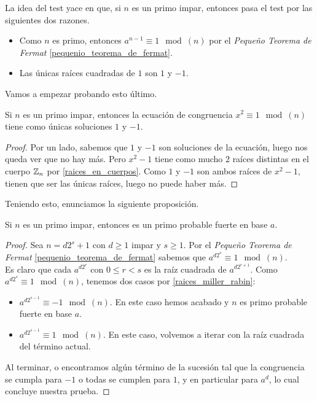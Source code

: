La idea del test yace en que, si $n$ es un primo impar, entonces pasa el test por las siguientes dos razones.

\begin{itemize}
	\item Como $n$ es primo, entonces $a^{n-1} \equiv 1 \mod(n)$ por el \textit{Pequeño Teorema de Fermat} \ref{pequenio_teorema_de_fermat}.
	
	\item Las únicas raíces cuadradas de $1$ son $1$ y $-1$.
\end{itemize}

Vamos a empezar probando esto último.

\begin{proposicion}\label{raices_miller_rabin}
	Si $n$ es un primo impar, entonces la ecuación de congruencia $x^2 \equiv 1 \mod(n)$ tiene como únicas soluciones $1$ y $-1$.
\end{proposicion}

\begin{proof}
	Por un lado, sabemos que $1$ y $-1$ son soluciones de la ecuación, luego nos queda ver que no hay más. Pero $x^2 - 1$ tiene como mucho $2$ raíces distintas en el cuerpo $\mathbb{Z}_n$ por \autoref{raices_en_cuerpos}. Como $1$ y $-1$ son ambos raíces de $x^2 - 1$, tienen que ser las únicas raíces, luego no puede haber más.
\end{proof}

Teniendo esto, enunciamos la siguiente proposición.

\begin{proposicion}\label{proposicion_miller_rabin}
	Si $n$ es un primo impar, entonces es un primo probable fuerte en base $a$.
\end{proposicion}

\begin{proof}
	Sea $n = d2^s + 1$ con $d \geq 1$ impar y $s \geq 1$. Por el \textit{Pequeño Teorema de Fermat} \ref{pequenio_teorema_de_fermat} sabemos que $a^{d2^s} \equiv 1 \mod(n)$.\\
	
	Es claro que cada $a^{d2^r}$ con $0 \leq r < s$ es la raíz cuadrada de $a^{d2^{r+1}}$. Como $a^{d2^s} \equiv 1 \mod(n)$, tenemos dos casos por \autoref{raices_miller_rabin}:
	
	\begin{itemize}
		\item $a^{d2^{s-1}} \equiv -1 \mod(n)$. En este caso hemos acabado y $n$ es primo probable fuerte en base $a$.
		
		\item $a^{d2^{s-1}} \equiv 1 \mod(n)$. En este caso, volvemos a iterar con la raíz cuadrada del término actual.
	\end{itemize}
	
	Al terminar, o encontramos algún término de la sucesión tal que la congruencia se cumpla para $-1$ o todas se cumplen para $1$, y en particular para $a^d$, lo cual concluye nuestra prueba.
\end{proof}

